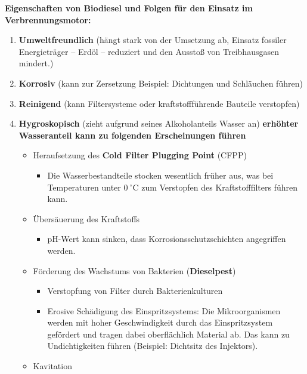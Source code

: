 \textbf{Eigenschaften von Biodiesel und Folgen für den Einsatz im
Verbrennungsmotor:}

\begin{enumerate}
\item
  \textbf{Umweltfreundlich} (hängt stark von der Umsetzung ab, Einsatz
  fossiler Energieträger -- Erdöl -- reduziert und den Ausstoß von
  Treibhausgasen mindert.)
\item
  \textbf{Korrosiv} (kann zur Zersetzung Beispiel: Dichtungen und
  Schläuchen führen)
\item
  \textbf{Reinigend} (kann Filtersysteme oder kraftstoffführende
  Bauteile verstopfen)
\item
  \textbf{Hygroskopisch} (zieht aufgrund seines Alkoholanteils Wasser
  an) \textbf{erhöhter Wasseranteil kann zu folgenden Erscheinungen
  führen}

  \begin{itemize}
  \item
    Heraufsetzung des \textbf{Cold Filter Plugging Point} (CFPP)

    \begin{itemize}
    \item
      Die Wasserbestandteile stocken wesentlich früher aus, was bei
      Temperaturen unter $0~^\circ\text{C}$ zum Verstopfen des
      Kraftstofffilters führen kann.
    \end{itemize}
  \item
    Übersäuerung des Kraftstoffs

    \begin{itemize}
    \item
      pH-Wert kann sinken, dass Korrosionsschutzschichten angegriffen
      werden.
    \end{itemize}
  \item
    Förderung des Wachstums von Bakterien (\textbf{Dieselpest})

    \begin{itemize}
    \item
      Verstopfung von Filter durch Bakterienkulturen
    \item
      Erosive Schädigung des Einspritzsystems: Die Mikroorganismen
      werden mit hoher Geschwindigkeit durch das Einspritzsystem
      gefördert und tragen dabei oberflächlich Material ab. Das kann zu
      Undichtigkeiten führen (Beispiel: Dichtsitz des Injektors).
    \end{itemize}
  \item
    Kavitation


\end{itemize}
\end{enumerate}
